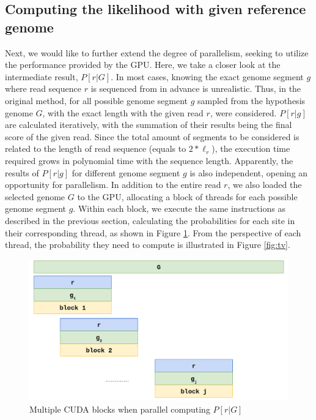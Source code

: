 \documentclass{PHlab-thesis}
\begin{document}
\subsection{Computing the likelihood with given reference genome}
Next, we would like to further extend the degree of parallelism, seeking to utilize the performance provided by the GPU. Here, we take a closer look at the intermediate result, $P[r|G]$. In most cases, knowing the exact genome segment $g$ where read sequence $r$ is sequenced from in advance is unrealistic. Thus, in the original method, for all possible genome segment $g$ sampled from the hypothesis genome $G$, with the exact length with the given read $r$, were considered. $P[r|g]$ are calculated iteratively, with the summation of their results being the final score of the given read. Since the total amount of segments to be considered is related to the length of read sequence (equals to $2*{\ell_r}$), the execution time required grows in polynomial time with the sequence length. Apparently, the results of $P[r|g]$ for different genome segment $g$ is also independent, opening an opportunity for parallelism. In addition to the entire read $r$, we also loaded the selected genome $G$ to the GPU, allocating a block of threads for each possible genome segment $g$. Within each block, we execute the same instructions as described in the previous section, calculating the probabilities for each site in their corresponding thread, as shown in Figure \ref{fig:prG}. From the perspective of each thread, the probability they need to compute is illustrated in Figure \ref{fig:tv}.
\begin{figure}
	\centering
	\includegraphics[scale=0.3]{figures/prG.png}
	\caption{Multiple CUDA blocks when parallel computing $P[r|G]$}
	\label{fig:prG} %
\end{figure}
\end{document}
